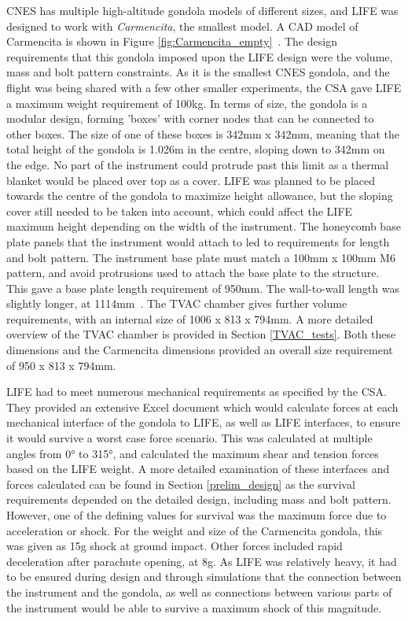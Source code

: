 CNES has multiple high-altitude gondola models of different sizes, and LIFE was designed to work with \textit{Carmencita}, the smallest model. A CAD model of Carmencita is shown in Figure \ref{fig:Carmencita_empty}~\citep{STRATOS_CARMENCITA_doc}. The design requirements that this gondola imposed upon the LIFE design were the volume, mass and bolt pattern constraints. As it is the smallest CNES gondola, and the flight was being shared with a few other smaller experiments, the CSA gave LIFE a maximum weight requirement of 100kg. In terms of size, the gondola is a modular design, forming 'boxes' with corner nodes that can be connected to other boxes. The size of one of these boxes is 342mm x 342mm, meaning that the total height of the gondola is 1.026m in the centre, sloping down to 342mm on the edge. No part of the instrument could protrude past this limit as a thermal blanket would be placed over top as a cover. LIFE was planned to be placed towards the centre of the gondola to maximize height allowance, but the sloping cover still needed to be taken into account, which could affect the LIFE maximum height depending on the width of the instrument. The honeycomb base plate panels that the instrument would attach to led to requirements for length and bolt pattern. The instrument base plate must match a 100mm x 100mm M6 pattern, and avoid protrusions used to attach the base plate to the structure. This gave a base plate length requirement of 950mm. The wall-to-wall length was slightly longer, at 1114mm~\citep{STRATOS_CARMENCITA_doc}. The TVAC chamber gives further volume requirements, with an internal size of 1006 x 813 x 794mm. A more detailed overview of the TVAC chamber is provided in Section \ref{TVAC_tests}. Both these dimensions and the Carmencita dimensions provided an overall size requirement of 950 x 813 x 794mm. 

LIFE had to meet numerous mechanical requirements as specified by the CSA. They provided an extensive Excel document which would calculate forces at each mechanical interface of the gondola to LIFE, as well as LIFE interfaces, to ensure it would survive a worst case force scenario. This was calculated at multiple angles from 0° to 315°, and calculated the maximum shear and tension forces based on the LIFE weight. A more detailed examination of these interfaces and forces calculated can be found in Section \ref{prelim_design} as the survival requirements depended on the detailed design, including mass and bolt pattern. However, one of the defining values for survival was the maximum force due to acceleration or shock. For the weight and size of the Carmencita gondola, this was given as 15g shock at ground impact. Other forces included rapid deceleration after parachute opening, at 8g. As LIFE was relatively heavy, it had to be ensured during design and through simulations that the connection between the instrument and the gondola, as well as connections between various parts of the instrument would be able to survive a maximum shock of this magnitude.

